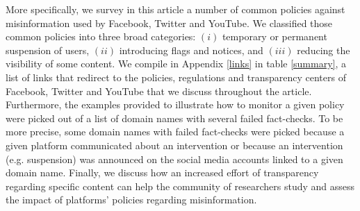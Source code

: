 \documentclass{article}
\begin{document}
\smallskip

More specifically, we survey in this article a number of common policies against misinformation used by Facebook, Twitter and YouTube. We classified those common policies into three broad categories: $(i)$ temporary or permanent suspension of users, $(ii)$ introducing flags and notices, and $(iii)$ reducing the visibility of some content. We compile in Appendix \ref{links} in table \ref{summary}, a list of links that redirect to the policies, regulations and transparency centers of Facebook, Twitter and YouTube that we discuss throughout the article. Furthermore, the examples provided to illustrate how to monitor a given policy were picked out of a list of domain names with several failed fact-checks. To be more precise, some domain names with failed fact-checks were picked because a given platform communicated about an intervention or because an intervention (e.g. suspension) was announced on the social media accounts linked to a given domain name. Finally, we discuss how an increased effort of transparency regarding specific content can help the community of researchers study and assess the impact of platforms' policies regarding misinformation. 

\smallskip 




\end{document}
